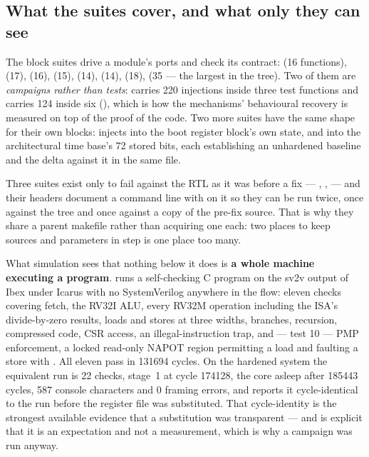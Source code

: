 \subsection{What the suites cover, and what only they can see}

The block suites drive a module's ports and check its contract:
 (16 functions),  (17),
 (16),  (15),
 (14),  (14),
 (18),  (35 --- the largest
in the tree). Two of them are \emph{campaigns rather than tests}:
 carries 220 injections inside three test
functions and  carries 124 inside six
(), which is how the mechanisms' behavioural
recovery is measured on top of the proof of the code. Two more suites
have the same shape for their own blocks: 
injects into the boot register block's own state, and
 into the architectural time base's 72 stored
bits, each establishing an unhardened baseline and the delta against it
in the same file.

Three suites exist only to fail against the RTL as it was before a fix
--- , ,
 --- and their headers document a command
line with  on it so they can be run twice, once against
the tree and once against a copy of the pre-fix source. That is why they
share a parent makefile rather than acquiring one each: two places to
keep sources and parameters in step is one place too many.

What simulation sees that nothing below it does is \textbf{a whole
machine executing a program}.  runs a self-checking
C program on the sv2v output of Ibex under Icarus with no SystemVerilog
anywhere in the flow: eleven checks covering fetch, the RV32I ALU, every
RV32M operation including the ISA's divide-by-zero results, loads and
stores at three widths, branches, recursion, compressed code, CSR access,
an illegal-instruction trap, and --- test 10 --- PMP enforcement, a
locked read-only NAPOT region permitting a load and faulting a store with
. All eleven pass in \num{131694} cycles. On the
hardened system the equivalent run is 22 checks, stage~1 at cycle
\num{174128}, the core asleep after \num{185443} cycles, 587 console
characters and 0 framing errors, and  reports it
cycle-identical to the run before the register file was substituted.
That cycle-identity is the strongest available evidence that a
substitution was transparent --- and  is explicit
that it is an expectation and not a measurement, which is why a campaign
was run anyway.

